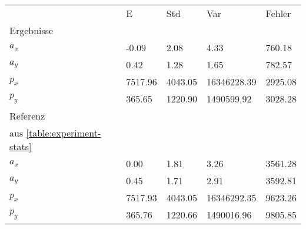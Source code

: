 \begin{tabular}{l|l|l|l|l}

     & E   & Std    & Var    & Fehler \\
\hhline{=|=|=|=|=}

Ergebnisse & & & & \\
$a_x$  &        -0.09 &         2.08 &         4.33 &       760.18 \\
$a_y$  &         0.42 &         1.28 &         1.65 &       782.57 \\
$p_x$  &      7517.96 &      4043.05 &  16346228.39 &      2925.08 \\
$p_y$  &       365.65 &      1220.90 &   1490599.92 &      3028.28 \\

\hline
Referenz & & & & \\
aus \ref{table:experiment-stats} & & & & \\
$a_x$  &         0.00 &         1.81 &         3.26 &      3561.28 \\
$a_y$  &         0.45 &         1.71 &         2.91 &      3592.81 \\
$p_x$  &      7517.93 &      4043.05 &  16346292.35 &      9623.26 \\
$p_y$  &       365.76 &      1220.66 &   1490016.96 &      9805.85 \\
\end{tabular}
